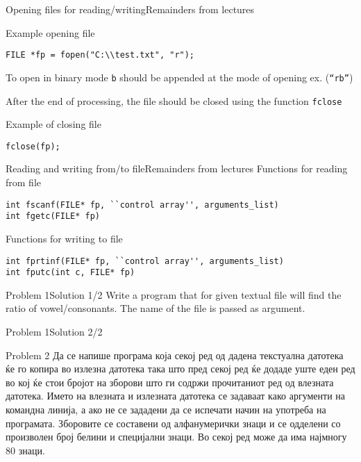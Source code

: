 \begin{frame}[fragile]{Opening files for reading/writing}{Remainders from
lectures}

\begin{exampleblock}{Example opening file}
\begin{lstlisting}
FILE *fp = fopen("C:\\test.txt", "r");
\end{lstlisting}
\begin{scriptsize}
To open in binary mode \texttt{b} should be appended at the mode of opening ex.
(\texttt{``rb''})
\end{scriptsize}
\end{exampleblock}
After the end of processing, the file should be closed using the function \texttt{fclose}
\begin{exampleblock}{Example of closing file}
\begin{lstlisting}
fclose(fp);
\end{lstlisting}
\end{exampleblock}
\end{frame}

\begin{frame}[fragile]{Reading and writing from/to
file}{Remainders from
lectures} 
Functions for reading from file
\begin{lstlisting}
int fscanf(FILE* fp, ``control array'', arguments_list)
int fgetc(FILE* fp)
\end{lstlisting}

Functions for writing to file
\begin{lstlisting}
int fprtinf(FILE* fp, ``control array'', arguments_list)
int fputc(int c, FILE* fp)
\end{lstlisting}

\end{frame}


\begin{frame}[fragile]{Problem 1}{Solution 1/2}
Write a program that for given textual file will find the ratio of
vowel/consonants. The name of the file is passed as argument.

\end{frame}

\begin{frame}[fragile]{Problem 1}{Solution 2/2}

\end{frame}

\begin{frame}{Problem 2}
Да се напише програма која секој ред од дадена текстуална датотека ќе го копира
во излезна датотека така што пред секој ред ќе додаде уште еден ред во кој ќе
стои бројот на зборови што ги содржи прочитаниот ред од влезната датотека. Името
на влезната и излезната датотека се задаваат како аргументи на командна линија,
а ако не се зададени да се испечати начин на употреба на програмата. Зборовите
се составени од алфанумерички знаци и се одделени со произволен број белини и
специјални знаци. Во секој ред може да има најмногу 80 знаци.
\end{frame}

